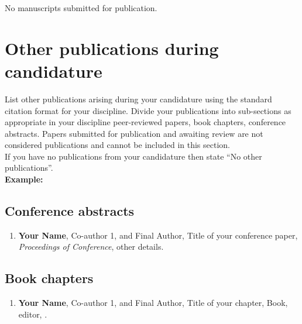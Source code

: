 
No manuscripts submitted for publication.



\section*{Other publications during candidature}

\begin{instructional}
    List other publications arising during your candidature using the standard citation format for your discipline. Divide your publications into sub-sections as appropriate in your discipline \eg{} peer-reviewed papers, book chapters, conference abstracts. Papers submitted for publication and awaiting review are not considered publications and cannot be included in this section.\\
    
    \noindent
    If you have no publications from your candidature then state ``No other publications''.\\
    
    \textbf{Example:}
    \subsection*{Conference abstracts}

    \begin{enumerate}

    \item \cite{DumyCitationKey} \textbf{Your Name}, Co-author 1, and Final Author, Title of your conference paper, \textit{Proceedings of Conference}, other details.

    \end{enumerate}

    \subsection*{Book chapters}

    \begin{enumerate}

    \item \cite{DumyCitationKey} \textbf{Your Name}, Co-author 1, and Final Author, Title of your chapter, Book, editor, \etc{}.

    \end{enumerate}

\end{instructional}

